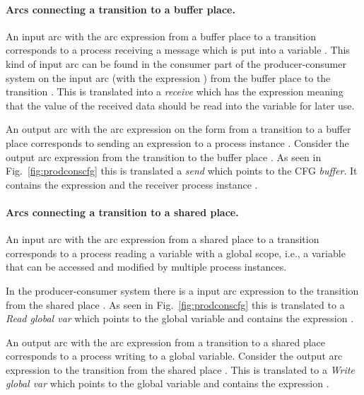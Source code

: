 \paragraph*{Arcs connecting a transition to a buffer place.}
An input arc with the arc expression  from a buffer place to a transition corresponds to a process receiving a message which is put into a variable . This kind of input arc can be found in the consumer part of the producer-consumer system on the input arc (with the expression ) from the buffer place  to the transition . This is translated into a \emph{receive} which has the expression  meaning that the value of the received data should be read into the variable  for later use. 

An output arc with the arc expression on the form  from a transition to a buffer place corresponds to sending an expression  to a process instance . Consider the output arc expression  from the transition  to the buffer place . As seen in Fig.~\ref{fig:prodconscfg} this is translated a \emph{send} which points to the CFG \emph{buffer}. It contains the expression  and the receiver process instance .

\paragraph*{Arcs connecting a transition to a shared place.}
An input arc with the arc expression  from a shared place to a transition corresponds to a process reading a variable with a global scope, i.e., a variable that can be accessed and modified by multiple process instances. 

In the producer-consumer system there is a input arc expression  to the transition  from the shared place . As seen in Fig.~\ref{fig:prodconscfg} this is translated to a \emph{Read global var} which points to the global variable  and contains the expression . 

An output arc with the arc expression  from a transition to a shared place corresponds to a process writing to a global variable. Consider the output arc expression to the transition  from the shared place . This is translated to a \emph{Write global var} which points to the global variable  and contains the expression .

